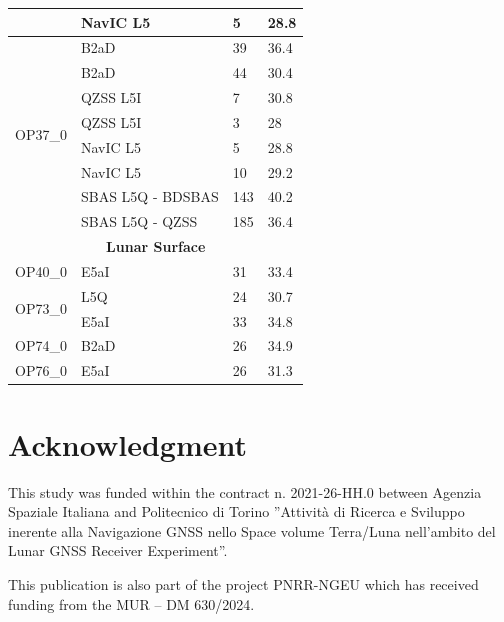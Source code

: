 \documentclass{IEEEtaes}
\begin{document}
\begin{table}[]
\begin{minipage}{0.48\textwidth}
\begin{tabular}{llll}
 & NavIC L5        & 5            & 28.8 \\
\midrule
\multirow{8}{*}{OP37\_0}
 & B2aD            & 39           & 36.4 \\
 & B2aD            & 44           & 30.4 \\
 & QZSS L5I        & 7            & 30.8 \\
 & QZSS L5I        & 3            & 28 \\
 & NavIC L5        & 5            & 28.8 \\
 & NavIC L5        & 10           & 29.2 \\
 & SBAS L5Q - BDSBAS & 143        & 40.2 \\
 & SBAS L5Q - QZSS  & 185        & 36.4 \\
\midrule
\multicolumn{4}{c}{\textbf{Lunar Surface}} \\
\hline
\multirow{1}{*}{OP40\_0}
 & E5aI            & 31           & 33.4 \\
\midrule
\multirow{2}{*}{OP73\_0}
 & L5Q             & 24           & 30.7 \\
 & E5aI            & 33           & 34.8 \\
\midrule
\multirow{1}{*}{OP74\_0}
 & B2aD            & 26           & 34.9 \\
\midrule
\multirow{1}{*}{OP76\_0}
 & E5aI            & 26           & 31.3 \\
\midrule
\hline
\end{tabular}

\end{minipage}
\end{table}

\section*{Acknowledgment}
This study was funded within the contract n. 2021-26-HH.0 between Agenzia Spaziale Italiana and Politecnico di Torino ”Attività di Ricerca e Sviluppo inerente alla Navigazione GNSS nello Space volume Terra/Luna nell’ambito del Lunar GNSS Receiver Experiment”. 

This publication is also  part of the project PNRR-NGEU which has received funding from the MUR – DM 630/2024.




 
\end{document}
